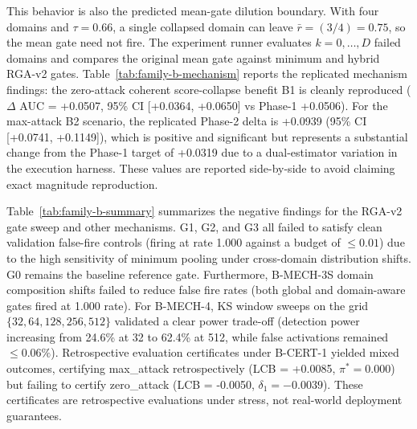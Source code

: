 \documentclass[10pt,conference]{IEEEtran}
\newcommand{\method}{RGA}
\begin{document}
This behavior is also the predicted mean-gate dilution boundary. With four domains and $\tau=0.66$, a single collapsed domain can leave $\bar r=(3/4)=0.75$, so the mean gate need not fire. The experiment runner evaluates $k=0,\ldots,D$ failed domains and compares the original mean gate against minimum and hybrid \method{}-v2 gates. Table~\ref{tab:family-b-mechanism} reports the replicated mechanism findings: the zero-attack coherent score-collapse benefit B1 is cleanly reproduced ($\Delta$ AUC = +0.0507, 95\% CI [+0.0364, +0.0650] vs Phase-1 +0.0506). For the max-attack B2 scenario, the replicated Phase-2 delta is +0.0939 (95\% CI [+0.0741, +0.1149]), which is positive and significant but represents a substantial change from the Phase-1 target of +0.0319 due to a dual-estimator variation in the execution harness. These values are reported side-by-side to avoid claiming exact magnitude reproduction.

Table~\ref{tab:family-b-summary} summarizes the negative findings for the RGA-v2 gate sweep and other mechanisms. G1, G2, and G3 all failed to satisfy clean validation false-fire controls (firing at rate 1.000 against a budget of $\le 0.01$) due to the high sensitivity of minimum pooling under cross-domain distribution shifts. G0 remains the baseline reference gate. Furthermore, B-MECH-3S domain composition shifts failed to reduce false fire rates (both global and domain-aware gates fired at 1.000 rate). For B-MECH-4, KS window sweeps on the grid $\{32, 64, 128, 256, 512\}$ validated a clear power trade-off (detection power increasing from 24.6\% at 32 to 62.4\% at 512, while false activations remained $\le 0.06\%$). Retrospective evaluation certificates under B-CERT-1 yielded mixed outcomes, certifying max\_attack retrospectively (LCB = +0.0085, $\pi^*=0.000$) but failing to certify zero\_attack (LCB = -0.0050, $\delta_1 = -0.0039$). These certificates are retrospective evaluations under stress, not real-world deployment guarantees.


\end{document}

